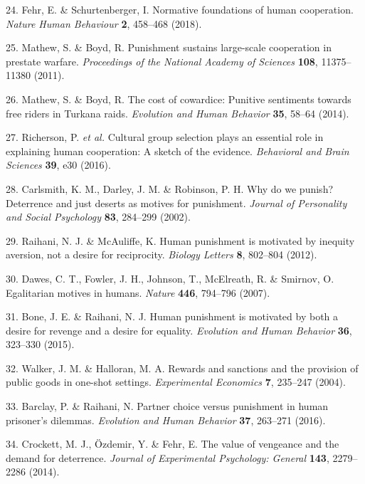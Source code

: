 \documentclass[
  english,
  man, donotrepeattitle,floatsintext]{apa6}
\newenvironment{cslreferences}%
  {}%
  {\par}
\begin{document}
\begin{cslreferences}
\leavevmode\hypertarget{ref-Fehr2018}{}%
24. Fehr, E. \& Schurtenberger, I. Normative foundations of human cooperation. \emph{Nature Human Behaviour} \textbf{2}, 458--468 (2018).

\leavevmode\hypertarget{ref-Mathew2011}{}%
25. Mathew, S. \& Boyd, R. Punishment sustains large-scale cooperation in prestate warfare. \emph{Proceedings of the National Academy of Sciences} \textbf{108}, 11375--11380 (2011).

\leavevmode\hypertarget{ref-Mathew2014}{}%
26. Mathew, S. \& Boyd, R. The cost of cowardice: Punitive sentiments towards free riders in Turkana raids. \emph{Evolution and Human Behavior} \textbf{35}, 58--64 (2014).

\leavevmode\hypertarget{ref-Richerson2016}{}%
27. Richerson, P. \emph{et al.} Cultural group selection plays an essential role in explaining human cooperation: A sketch of the evidence. \emph{Behavioral and Brain Sciences} \textbf{39}, e30 (2016).

\leavevmode\hypertarget{ref-Carlsmith2002}{}%
28. Carlsmith, K. M., Darley, J. M. \& Robinson, P. H. Why do we punish? Deterrence and just deserts as motives for punishment. \emph{Journal of Personality and Social Psychology} \textbf{83}, 284--299 (2002).

\leavevmode\hypertarget{ref-Raihani2012b}{}%
29. Raihani, N. J. \& McAuliffe, K. Human punishment is motivated by inequity aversion, not a desire for reciprocity. \emph{Biology Letters} \textbf{8}, 802--804 (2012).

\leavevmode\hypertarget{ref-Dawes2007}{}%
30. Dawes, C. T., Fowler, J. H., Johnson, T., McElreath, R. \& Smirnov, O. Egalitarian motives in humans. \emph{Nature} \textbf{446}, 794--796 (2007).

\leavevmode\hypertarget{ref-Bone2015}{}%
31. Bone, J. E. \& Raihani, N. J. Human punishment is motivated by both a desire for revenge and a desire for equality. \emph{Evolution and Human Behavior} \textbf{36}, 323--330 (2015).

\leavevmode\hypertarget{ref-Walker2004}{}%
32. Walker, J. M. \& Halloran, M. A. Rewards and sanctions and the provision of public goods in one-shot settings. \emph{Experimental Economics} \textbf{7}, 235--247 (2004).

\leavevmode\hypertarget{ref-Barclay2016}{}%
33. Barclay, P. \& Raihani, N. Partner choice versus punishment in human prisoner's dilemmas. \emph{Evolution and Human Behavior} \textbf{37}, 263--271 (2016).

\leavevmode\hypertarget{ref-Crockett2014}{}%
34. Crockett, M. J., Özdemir, Y. \& Fehr, E. The value of vengeance and the demand for deterrence. \emph{Journal of Experimental Psychology: General} \textbf{143}, 2279--2286 (2014).


\end{cslreferences}
\end{document}
